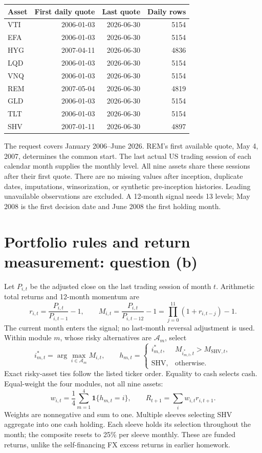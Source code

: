 \documentclass[11pt,letterpaper]{article}
\begin{document}
\begin{center}\small\begin{tabular}{lrrr}\toprule
Asset & First daily quote & Last quote & Daily rows\\\midrule
VTI & 2006-01-03 & 2026-06-30 & 5154\\
EFA & 2006-01-03 & 2026-06-30 & 5154\\
HYG & 2007-04-11 & 2026-06-30 & 4836\\
LQD & 2006-01-03 & 2026-06-30 & 5154\\
VNQ & 2006-01-03 & 2026-06-30 & 5154\\
REM & 2007-05-04 & 2026-06-30 & 4819\\
GLD & 2006-01-03 & 2026-06-30 & 5154\\
TLT & 2006-01-03 & 2026-06-30 & 5154\\
SHV & 2007-01-11 & 2026-06-30 & 4897\\
\bottomrule\end{tabular}\end{center}
The request covers January 2006--June 2026. REM's first available quote, May 4, 2007, determines the common start. The last actual US trading session of each calendar month supplies the monthly level. All nine assets share these sessions after their first quote. There are no missing values after inception, duplicate dates, imputations, winsorization, or synthetic pre-inception histories. Leading unavailable observations are excluded. A 12-month signal needs 13 levels; May 2008 is the first decision date and June 2008 the first holding month.

\newpage
\section{Portfolio rules and return measurement: question (b)}
Let \(P_{i,t}\) be the adjusted close on the last trading session of month \(t\). Arithmetic total returns and 12-month momentum are
\[
r_{i,t}=\frac{P_{i,t}}{P_{i,t-1}}-1,\qquad
M_{i,t}=\frac{P_{i,t}}{P_{i,t-12}}-1
       =\prod_{j=0}^{11}(1+r_{i,t-j})-1.
\]
The current month enters the signal; no last-month reversal adjustment is used. Within module \(m\), whose risky alternatives are \(\mathcal A_m\), select
\[
i^*_{m,t}=\arg\max_{i\in\mathcal A_m}M_{i,t},\qquad
h_{m,t}=
\begin{cases}
i^*_{m,t},&M_{i^*_{m,t},t}>M_{\mathrm{SHV},t},\\
\mathrm{SHV},&\text{otherwise}.
\end{cases}
\]
Exact risky-asset ties follow the listed ticker order. Equality to cash selects cash. Equal-weight the four modules, not all nine assets:
\[
w_{i,t}=\frac14\sum_{m=1}^{4}\mathbf1\{h_{m,t}=i\},\qquad
R_{t+1}=\sum_i w_{i,t}r_{i,t+1}.
\]
Weights are nonnegative and sum to one. Multiple sleeves selecting SHV aggregate into one cash holding. Each sleeve holds its selection throughout the month; the composite resets to 25\% per sleeve monthly. These are funded returns, unlike the self-financing FX excess returns in earlier homework.
\end{document}
